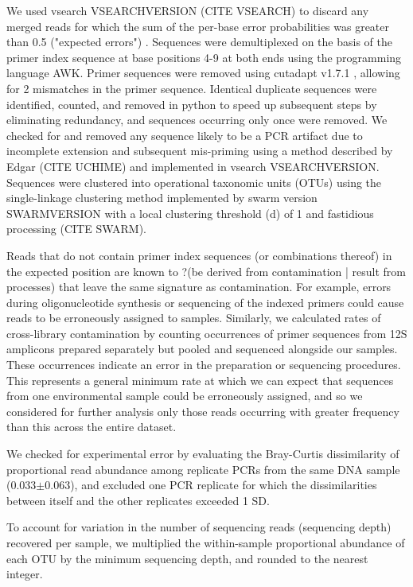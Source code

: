 \documentclass[11pt,letterpaper]{article} %
\begin{document}
We used vsearch VSEARCHVERSION (CITE VSEARCH) to discard any merged reads for which the sum of the per-base error probabilities was greater than 0.5 ("expected errors") \cite{Edgar2010}.
Sequences were demultiplexed on the basis of the primer index sequence at base positions 4-9 at both ends using the programming language AWK.
Primer sequences were removed using cutadapt v1.7.1 \cite{Martin2011}, allowing for 2 mismatches in the primer sequence.
Identical duplicate sequences were identified, counted, and removed in python to speed up subsequent steps by eliminating redundancy, and sequences occurring only once were removed.
We checked for and removed any sequence likely to be a PCR artifact due to incomplete extension and subsequent mis-priming using a method described by Edgar (CITE UCHIME\cite{Edgar2010}) and implemented in vsearch VSEARCHVERSION.
Sequences were clustered into operational taxonomic units (OTUs) using the single-linkage clustering method implemented by swarm version SWARMVERSION with a local clustering threshold (d) of 1 and fastidious processing (CITE SWARM).

Reads that do not contain primer index sequences (or combinations thereof) in the expected position are known to ?(be derived from contamination | result from processes) that leave the same signature as contamination.
For example, errors during oligonucleotide synthesis or sequencing of the indexed primers could cause reads to be erroneously assigned to samples.
Similarly, we calculated rates of cross-library contamination by counting occurrences of primer sequences from 12S amplicons prepared separately but pooled and sequenced alongside our samples.
These occurrences indicate an error in the preparation or sequencing procedures.
This represents a general minimum rate at which we can expect that sequences from one environmental sample could be erroneously assigned, and so we considered for further analysis only those reads occurring with greater frequency than this across the entire dataset.

We checked for experimental error by evaluating the Bray-Curtis dissimilarity of proportional read abundance among replicate PCRs from the same DNA sample (0.033$\pm$0.063), and excluded one PCR replicate for which the dissimilarities between itself and the other replicates exceeded 1 SD.%

To account for variation in the number of sequencing reads (sequencing depth) recovered per sample, we multiplied the within-sample proportional abundance of each OTU by the minimum sequencing depth, and rounded to the nearest integer.
\end{document}
